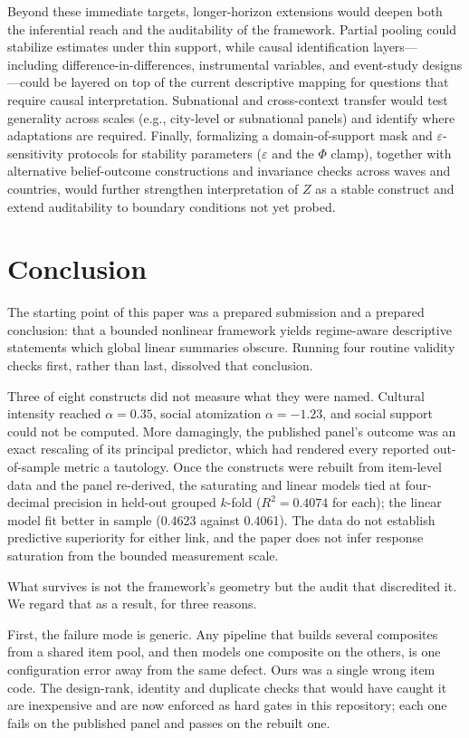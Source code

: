 \documentclass[11pt]{article}
\begin{document}
Beyond these immediate targets, longer-horizon extensions would deepen both the inferential reach and the auditability of the framework. Partial pooling \parencite{Baltagi2005PanelData} could stabilize estimates under thin support, while causal identification layers---including difference-in-differences, instrumental variables, and event-study designs \parencite{Wooldridge2010PanelData}---could be layered on top of the current descriptive mapping for questions that require causal interpretation. Subnational and cross-context transfer would test generality across scales (e.g., city-level or subnational panels) and identify where adaptations are required. Finally, formalizing a domain-of-support mask and $\varepsilon$-sensitivity protocols for stability parameters ($\varepsilon$ and the $\Phi$ clamp), together with alternative belief-outcome constructions and invariance checks across waves and countries, would further strengthen interpretation of $Z$ as a stable construct and extend auditability to boundary conditions not yet probed.
\section{Conclusion}
The starting point of this paper was a prepared submission and a prepared conclusion: that a bounded nonlinear framework yields regime-aware descriptive statements which global linear summaries obscure. Running four routine validity checks first, rather than last, dissolved that conclusion.

Three of eight constructs did not measure what they were named. Cultural intensity reached $\alpha=0.35$, social atomization $\alpha=-1.23$, and social support could not be computed. More damagingly, the published panel's outcome was an exact rescaling of its principal predictor, which had rendered every reported out-of-sample metric a tautology. Once the constructs were rebuilt from item-level data and the panel re-derived, the saturating and linear models tied at four-decimal precision in held-out grouped $k$-fold ($R^2=\num{0.4074}$ for each); the linear model fit better in sample (\num{0.4623} against \num{0.4061}). The data do not establish predictive superiority for either link, and the paper does not infer response saturation from the bounded measurement scale.

What survives is not the framework's geometry but the audit that discredited it. We regard that as a result, for three reasons.

First, the failure mode is generic. Any pipeline that builds several composites from a shared item pool, and then models one composite on the others, is one configuration error away from the same defect. Ours was a single wrong item code. The design-rank, identity and duplicate checks that would have caught it are inexpensive and are now enforced as hard gates in this repository; each one fails on the published panel and passes on the rebuilt one.
\end{document}

